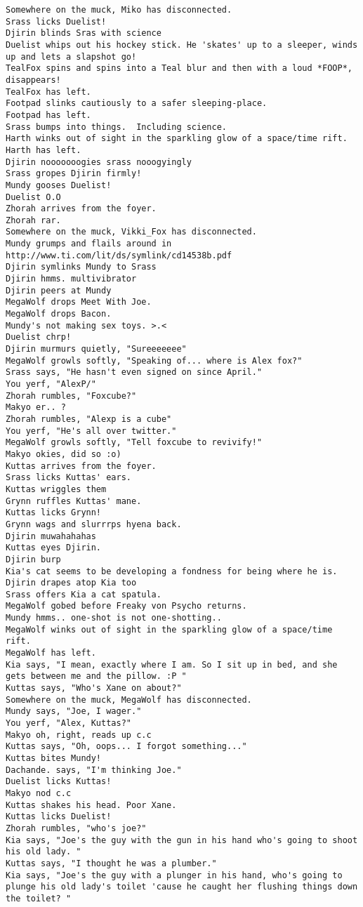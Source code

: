 \begin{verbatim}
Somewhere on the muck, Miko has disconnected.
Srass licks Duelist!
Djirin blinds Sras with science
Duelist whips out his hockey stick. He 'skates' up to a sleeper, winds up and lets a slapshot go!
TealFox spins and spins into a Teal blur and then with a loud *FOOP*, disappears!
TealFox has left.
Footpad slinks cautiously to a safer sleeping-place.
Footpad has left.
Srass bumps into things.  Including science.
Harth winks out of sight in the sparkling glow of a space/time rift.
Harth has left.
Djirin nooooooogies srass nooogyingly
Srass gropes Djirin firmly!
Mundy gooses Duelist!
Duelist O.O
Zhorah arrives from the foyer.
Zhorah rar.
Somewhere on the muck, Vikki_Fox has disconnected.
Mundy grumps and flails around in http://www.ti.com/lit/ds/symlink/cd14538b.pdf
Djirin symlinks Mundy to Srass
Djirin hmms. multivibrator
Djirin peers at Mundy
MegaWolf drops Meet With Joe.
MegaWolf drops Bacon.
Mundy's not making sex toys. >.<
Duelist chrp!
Djirin murmurs quietly, "Sureeeeeee"
MegaWolf growls softly, "Speaking of... where is Alex fox?"
Srass says, "He hasn't even signed on since April."
You yerf, "AlexP/"
Zhorah rumbles, "Foxcube?"
Makyo er.. ?
Zhorah rumbles, "Alexp is a cube"
You yerf, "He's all over twitter."
MegaWolf growls softly, "Tell foxcube to revivify!"
Makyo okies, did so :o)
Kuttas arrives from the foyer.
Srass licks Kuttas' ears.
Kuttas wriggles them
Grynn ruffles Kuttas' mane.
Kuttas licks Grynn!
Grynn wags and slurrrps hyena back.
Djirin muwahahahas
Kuttas eyes Djirin.
Djirin burp
Kia's cat seems to be developing a fondness for being where he is.
Djirin drapes atop Kia too
Srass offers Kia a cat spatula.
MegaWolf gobed before Freaky von Psycho returns.
Mundy hmms.. one-shot is not one-shotting..
MegaWolf winks out of sight in the sparkling glow of a space/time rift.
MegaWolf has left.
Kia says, "I mean, exactly where I am. So I sit up in bed, and she gets between me and the pillow. :P "
Kuttas says, "Who's Xane on about?"
Somewhere on the muck, MegaWolf has disconnected.
Mundy says, "Joe, I wager."
You yerf, "Alex, Kuttas?"
Makyo oh, right, reads up c.c
Kuttas says, "Oh, oops... I forgot something..."
Kuttas bites Mundy!
Dachande. says, "I'm thinking Joe."
Duelist licks Kuttas!
Makyo nod c.c
Kuttas shakes his head. Poor Xane.
Kuttas licks Duelist!
Zhorah rumbles, "who's joe?"
Kia says, "Joe's the guy with the gun in his hand who's going to shoot his old lady. "
Kuttas says, "I thought he was a plumber."
Kia says, "Joe's the guy with a plunger in his hand, who's going to plunge his old lady's toilet 'cause he caught her flushing things down the toilet? "

\end{verbatim}
